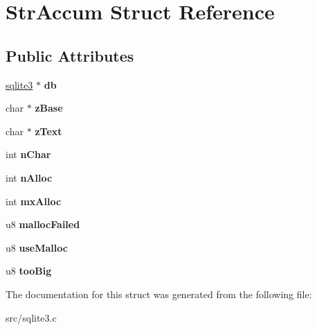 \hypertarget{struct_str_accum}{\section{Str\-Accum Struct Reference}
\label{struct_str_accum}
}
\subsection*{Public Attributes}
\begin{DoxyCompactItemize}
\item 
\hypertarget{struct_str_accum_ade44091c9a91671c9457b9e4a98a9a5d}{\hyperlink{structsqlite3}{sqlite3} $\ast$ {\bfseries db}}\label{struct_str_accum_ade44091c9a91671c9457b9e4a98a9a5d}

\item 
\hypertarget{struct_str_accum_a5797e2f288573ee98a4025f0f96fe50d}{char $\ast$ {\bfseries z\-Base}}\label{struct_str_accum_a5797e2f288573ee98a4025f0f96fe50d}

\item 
\hypertarget{struct_str_accum_ac45a51cb7b85da2ae9865eac21d416dc}{char $\ast$ {\bfseries z\-Text}}\label{struct_str_accum_ac45a51cb7b85da2ae9865eac21d416dc}

\item 
\hypertarget{struct_str_accum_a88bf779588ca597a41fde3e41186e003}{int {\bfseries n\-Char}}\label{struct_str_accum_a88bf779588ca597a41fde3e41186e003}

\item 
\hypertarget{struct_str_accum_ae2f21c484b737b9903e695977c27815a}{int {\bfseries n\-Alloc}}\label{struct_str_accum_ae2f21c484b737b9903e695977c27815a}

\item 
\hypertarget{struct_str_accum_ab9985e4aabc65bebbf026881ce0b59bd}{int {\bfseries mx\-Alloc}}\label{struct_str_accum_ab9985e4aabc65bebbf026881ce0b59bd}

\item 
\hypertarget{struct_str_accum_a6bc89e5ed8495ddcddadf0940f236c84}{u8 {\bfseries malloc\-Failed}}\label{struct_str_accum_a6bc89e5ed8495ddcddadf0940f236c84}

\item 
\hypertarget{struct_str_accum_abc135ceee2e63f41c101aceca5e9417b}{u8 {\bfseries use\-Malloc}}\label{struct_str_accum_abc135ceee2e63f41c101aceca5e9417b}

\item 
\hypertarget{struct_str_accum_ae5b62e58c33302b44fedf0e204757ced}{u8 {\bfseries too\-Big}}\label{struct_str_accum_ae5b62e58c33302b44fedf0e204757ced}

\end{DoxyCompactItemize}


The documentation for this struct was generated from the following file\-:\begin{DoxyCompactItemize}
\item 
src/sqlite3.\-c\end{DoxyCompactItemize}
